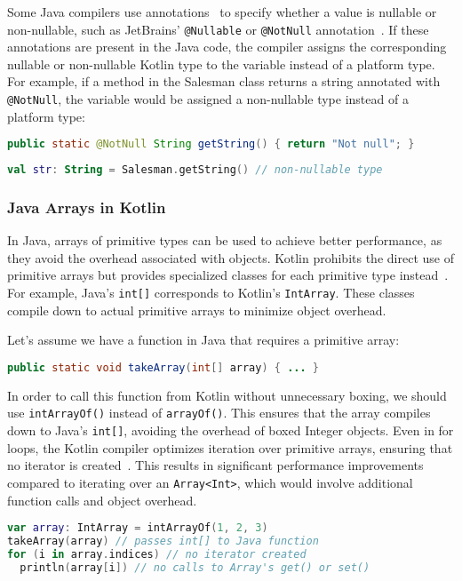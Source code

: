 \documentclass[a4paper,11pt]{article}
\begin{document}
Some Java compilers use annotations~\cite{interop-nullability-annotations} to specify whether a value is nullable or non-nullable, such as JetBrains' \texttt{@Nullable} or \texttt{@NotNull} annotation~\cite{JetBrains-annotations}. If these annotations are present in the Java code, the compiler assigns the corresponding nullable or non-nullable Kotlin type to the variable instead of a platform type. For example, if a method in the Salesman class returns a string annotated with \texttt{@NotNull}, the variable would be assigned a non-nullable type instead of a platform type:
\begin{lstlisting}[language=Java]
public static @NotNull String getString() { return "Not null"; }
\end{lstlisting}
\begin{lstlisting}[language=Kotlin]
val str: String = Salesman.getString() // non-nullable type
\end{lstlisting}

\subsubsection{Java Arrays in Kotlin}
In Java, arrays of primitive types can be used to achieve better performance, as they avoid the overhead associated with objects. Kotlin prohibits the direct use of primitive arrays but provides specialized classes for each primitive type instead~\cite{interop-arrays}. For example, Java's \texttt{int[]} corresponds to Kotlin's \texttt{IntArray}. These classes compile down to actual primitive arrays to minimize object overhead.

Let's assume we have a function in Java that requires a primitive array:
\begin{lstlisting}[language=Java]
public static void takeArray(int[] array) { ... }
\end{lstlisting}

In order to call this function from Kotlin without unnecessary boxing, we should use \texttt{intArrayOf()} instead of \texttt{arrayOf()}. This ensures that the array compiles down to Java's \texttt{int[]}, avoiding the overhead of boxed Integer objects. Even in for loops, the Kotlin compiler optimizes iteration over primitive arrays, ensuring that no iterator is created~\cite{interop-arrays}. This results in significant performance improvements compared to iterating over an \texttt{Array<Int>}, which would involve additional function calls and object overhead.

\begin{lstlisting}[language=Kotlin]
var array: IntArray = intArrayOf(1, 2, 3)
takeArray(array) // passes int[] to Java function
for (i in array.indices) // no iterator created
  println(array[i]) // no calls to Array's get() or set()
\end{lstlisting}
\end{document}
